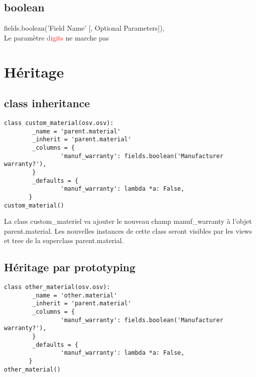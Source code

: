 \documentclass[12pt,a4paper]{article}
\begin{document}
\subsection{boolean}
\label{sec:bool}

fields.boolean('Field Name' [, Optional Parameters]),\\
Le paramètre \textcolor{red}{digits} ne marche pas 

\section{Héritage}
\label{sec:inherit}

\subsection{class inheritance}
\label{sec:inheritance}

\begin{verbatim}
class custom_material(osv.osv):
        _name = 'parent.material'
        _inherit = 'parent.material'
        _columns = {
                'manuf_warranty': fields.boolean('Manufacturer warranty?'),
        }
        _defaults = {
                'manuf_warranty': lambda *a: False,
       }
custom_material()
\end{verbatim}





La class custom\_materiel va ajouter le nouveau champ manuf\_warranty à l'objet parent.material. Les nouvelles instances de cette class seront visibles par les views et tree de la superclass parent.material.

\subsection{Héritage par prototyping}
\label{sec:prototype}

\begin{verbatim}
class other_material(osv.osv):
        _name = 'other.material'
        _inherit = 'parent.material'
        _columns = {
                'manuf_warranty': fields.boolean('Manufacturer warranty?'),
        }
        _defaults = {
                'manuf_warranty': lambda *a: False,
       }
other_material()
\end{verbatim}


 \\
\end{document}
